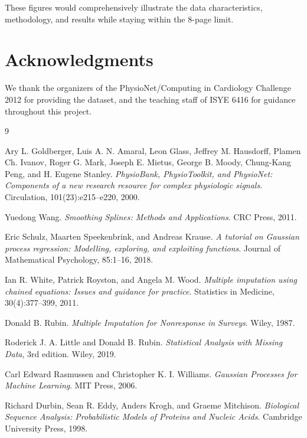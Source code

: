 \documentclass[11pt]{article}
\begin{document}
These figures would comprehensively illustrate the data characteristics, methodology, and results while staying within the 8-page limit.

\section*{Acknowledgments}
We thank the organizers of the PhysioNet/Computing in Cardiology Challenge 2012 for providing the dataset, and the teaching staff of ISYE 6416 for guidance throughout this project.

\begin{thebibliography}{9}

Ary L. Goldberger, Luis A. N. Amaral, Leon Glass, Jeffrey M. Hausdorff, Plamen Ch. Ivanov, Roger G. Mark, Joseph E. Mietus, George B. Moody, Chung-Kang Peng, and H. Eugene Stanley.
\textit{PhysioBank, PhysioToolkit, and PhysioNet: Components of a new research resource for complex physiologic signals}.
Circulation, 101(23):e215–e220, 2000.

Yuedong Wang.
\textit{Smoothing Splines: Methods and Applications}.
CRC Press, 2011.

Eric Schulz, Maarten Speekenbrink, and Andreas Krause.
\textit{A tutorial on Gaussian process regression: Modelling, exploring, and exploiting functions}.
Journal of Mathematical Psychology, 85:1–16, 2018.

Ian R. White, Patrick Royston, and Angela M. Wood.
\textit{Multiple imputation using chained equations: Issues and guidance for practice}.
Statistics in Medicine, 30(4):377–399, 2011.

Donald B. Rubin.
\textit{Multiple Imputation for Nonresponse in Surveys}.
Wiley, 1987.

Roderick J. A. Little and Donald B. Rubin.
\textit{Statistical Analysis with Missing Data}, 3rd edition.
Wiley, 2019.

Carl Edward Rasmussen and Christopher K. I. Williams.
\textit{Gaussian Processes for Machine Learning}.
MIT Press, 2006.

Richard Durbin, Sean R. Eddy, Anders Krogh, and Graeme Mitchison.
\textit{Biological Sequence Analysis: Probabilistic Models of Proteins and Nucleic Acids}.
Cambridge University Press, 1998.

\end{thebibliography}
\end{document}
